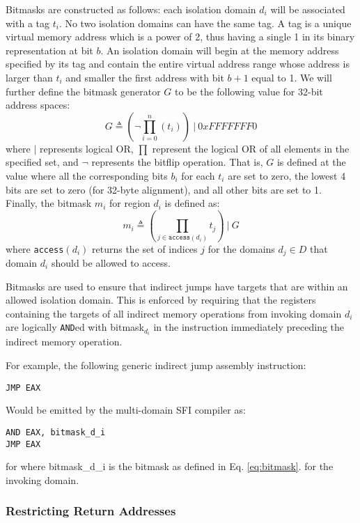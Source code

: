 \documentclass[12pt]{article}
\begin{document}
Bitmasks are constructed as follows: each isolation domain $d_i$ will be associated with a tag $t_i$. No two isolation domains can have the same tag. A tag is a unique virtual memory address which is a power of 2, thus having a single 1 in its binary representation at bit $b$.  An isolation domain will begin at the memory address specified by its tag and contain the entire virtual address range whose address is larger than $t_i$ and smaller the first address with bit $b+1$ equal to 1. We will further define the bitmask generator $G$ to be the following value for 32-bit address spaces:
\begin{equation} \label{eq:G}
G \triangleq (\neg\prod_{i=0}^n(t_i))\ |\  0xFFFFFFF0
\end{equation}
where $|$ represents logical OR, $\prod$ represent the logical OR of all elements in the specified set, and $\neg$ represents the bitflip operation. That is, $G$ is defined at the value where all the corresponding bits $b_i$ for each $t_i$ are set to zero, the lowest 4 bits are set to zero (for 32-byte alignment), and all other bits are set to 1. Finally, the bitmask $m_i$  for region $d_i$ is defined as:
\begin{equation} \label{eq:bitmask}
m_i \triangleq (\prod_{j\in\texttt{access}(d_i)}t_j)\ |\ G
\end{equation}
where \texttt{access}$(d_i)$ returns the set of indices $j$ for the domains $d_j\in D$ that domain $d_i$ should be allowed to access.

Bitmasks are used to ensure that indirect jumps have targets that are within an allowed isolation domain. This is enforced by requiring that the registers containing the targets of all indirect memory operations from invoking domain $d_i$ are logically \texttt{AND}ed with bitmask$_{d_i}$ in the instruction immediately preceding the indirect memory operation.

For example, the following generic indirect jump assembly instruction:
\begin{verbatim}
JMP EAX
\end{verbatim}
Would be emitted by the multi-domain SFI compiler as:
\begin{verbatim}
AND EAX, bitmask_d_i
JMP EAX
\end{verbatim}
for where bitmask\_d\_i is the bitmask as defined in Eq. \ref{eq:bitmask}.  for the invoking domain.

\subsubsection{Restricting Return Addresses}
\end{document}
